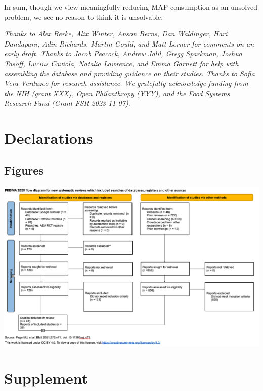 \documentclass[sn-nature,referee,pdflatex]{sn-jnl}
\begin{document}
In sum, though we view meaningfully reducing MAP consumption as an
unsolved problem, we see no reason to think it is unsolvable.


\emph{Thanks to Alex Berke, Alix Winter, Anson Berns, Dan Waldinger,
Hari Dandapani, Adin Richards, Martin Gould, and Matt Lerner for
comments on an early draft. Thanks to Jacob Peacock, Andrew Jalil, Gregg
Sparkman, Joshua Tasoff, Lucius Caviola, Natalia Lawrence, and Emma
Garnett for help with assembling the database and providing guidance on
their studies. Thanks to Sofia Vera Verduzco for research assistance. We
gratefully acknowledge funding from the NIH (grant XXX), Open
Philanthropy (YYY), and the Food Systems Research Fund (Grant FSR
2023-11-07).}

\section*{Declarations}\label{declarations}

\newpage

\clearpage

\subsection{Figures}\label{figures}

\begin{center}\includegraphics[width=1.2\linewidth,]{./figures/prisma-diagram} \end{center}

\newpage

\section{Supplement}\label{Sec5}
\end{document}
